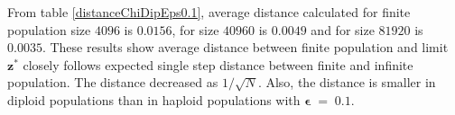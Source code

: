 From table \ref{distanceChiDipEps0.1}, average distance calculated for finite population size $4096$ is $0.0156$, 
for size $40960$ is $0.0049$ and for size $81920$ is $0.0035$. These results show average distance 
between finite population and limit $\bm{z^\ast}$ closely follows expected single step distance 
between finite and infinite population. The distance decreased as $1/\sqrt{N}$. 
Also, the distance is smaller in diploid populations than in haploid populations with $\bm{\epsilon} \;=\; 0.1$.

 
